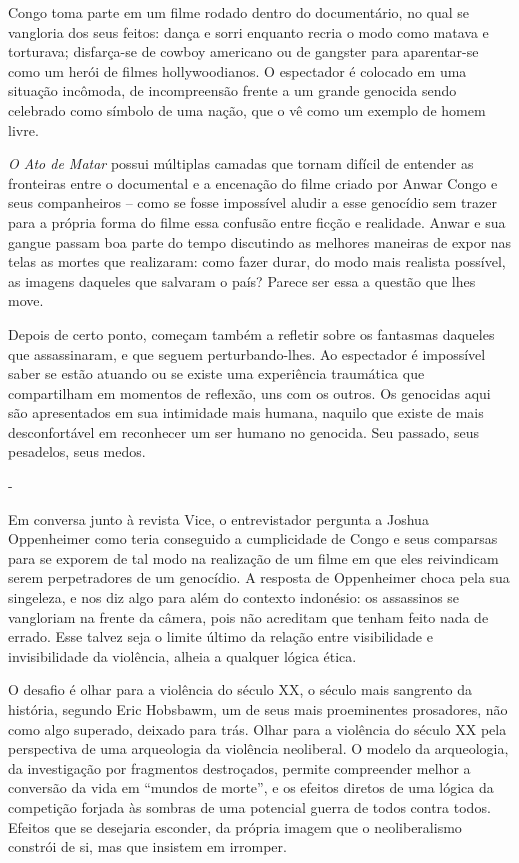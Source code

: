Congo toma parte em um filme rodado dentro do documentário, no qual se
vangloria dos seus feitos: dança e sorri enquanto recria o modo como
matava e torturava; disfarça-se de cowboy americano ou de gangster para
aparentar-se como um herói de filmes hollywoodianos. O espectador é
colocado em uma situação incômoda, de incompreensão frente a um grande
genocida sendo celebrado como símbolo de uma nação, que o vê como um
exemplo de homem livre.

\emph{O Ato de Matar} possui múltiplas camadas que tornam difícil de
entender as fronteiras entre o documental e a encenação do filme criado
por Anwar Congo e seus companheiros -- como se fosse impossível aludir a
esse genocídio sem trazer para a própria forma do filme essa confusão
entre ficção e realidade. Anwar e sua gangue passam boa parte do tempo
discutindo as melhores maneiras de expor nas telas as mortes que
realizaram: como fazer durar, do modo mais realista possível, as imagens
daqueles que salvaram o país? Parece ser essa a questão que lhes move.

Depois de certo ponto, começam também a refletir sobre os fantasmas
daqueles que assassinaram, e que seguem perturbando-lhes. Ao espectador
é impossível saber se estão atuando ou se existe uma experiência
traumática que compartilham em momentos de reflexão, uns com os outros.
Os genocidas aqui são apresentados em sua intimidade mais humana,
naquilo que existe de mais desconfortável em reconhecer um ser humano no
genocida. Seu passado, seus pesadelos, seus medos.

-

Em conversa junto à revista Vice, o entrevistador pergunta a Joshua
Oppenheimer como teria conseguido a cumplicidade de Congo e seus
comparsas para se exporem de tal modo na realização de um filme em que
eles reivindicam serem perpetradores de um genocídio. A resposta de
Oppenheimer choca pela sua singeleza, e nos diz algo para além do
contexto indonésio: os assassinos se vangloriam na frente da câmera,
pois não acreditam que tenham feito nada de errado. Esse talvez seja o
limite último da relação entre visibilidade e invisibilidade da
violência, alheia a qualquer lógica ética.

O desafio é olhar para a violência do século XX, o século mais sangrento
da história, segundo Eric Hobsbawm, um de seus mais proeminentes
prosadores, não como algo superado, deixado para trás. Olhar para a
violência do século XX pela perspectiva de uma arqueologia da violência
neoliberal. O modelo da arqueologia, da investigação por fragmentos
destroçados, permite compreender melhor a conversão da vida em ``mundos
de morte'', e os efeitos diretos de uma lógica da competição forjada às
sombras de uma potencial guerra de todos contra todos. Efeitos que se
desejaria esconder, da própria imagem que o neoliberalismo constrói de
si, mas que insistem em irromper.

